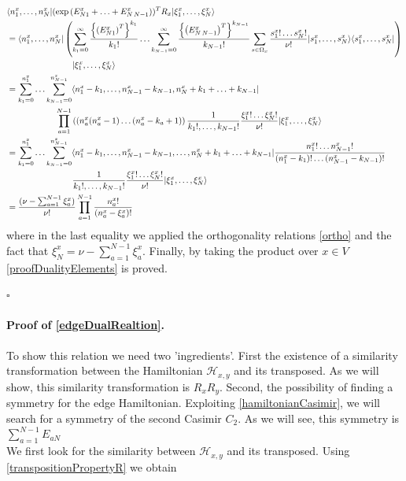 \documentclass[10pt]{article}
\numberwithin{equation}{section}
\numberwithin{equation}{subsection}
\begin{document}
\begin{align*}
&\langle n_{1}^{x},\ldots,n_{N}^{x}|(\exp{(E_{N1}^{x}+\ldots+E_{N\,N-1}^{x})})^{T}R_{x}|\xi_{1}^{x},\ldots,\xi_{N}^{x}\rangle\\&= \langle  n_{1}^{x},\ldots,n_{N}^{x}|\left(\sum_{k_{1}=0}^{\infty}\frac{\left\{\left(E_{N1}^{x}\right)^{T}\right\}^{k_{1}}}{k_{1}!}\ldots\sum_{k_{N-1}=0}^{\infty}\frac{\left\{\left(E_{N\,N-1}^{x}\right)^{T}\right\}^{k_{N-1}}}{k_{N-1}!}\sum_{s\in\Omega_{x}}\frac{s_{1}^{x}!\ldots s_{N}^{x}!}{\nu!}|s_{1}^{x},\ldots,s_{N}^{x}\rangle\langle s_{1}^{x},\ldots,s_{N}^{x}|\right)
\\&
\hspace{2.cm}\qquad|\xi_{1}^{x},\ldots,\xi_{N}^{x}\rangle
\\&=
\sum_{k_{1}=0}^{n_{1}^{x}}\ldots\sum_{k_{N-1}=0}^{n_{N-1}^{x}}\langle n_{1}^{x}-k_{1},\ldots,n_{N-1}^{x}-k_{N-1},n_{N}^{x}+k_{1}+\ldots+k_{N-1}|
\\&
\hspace{2.cm}\prod_{a=1}^{N-1}\left((n_{a}^{x}(n_{a}^{x}-1)\ldots (n_{a}^{x}-k_{a}+1)\right)\frac{1}{k_{1}!,\ldots,k_{N-1}!}\frac{\xi_{1}^{x}!\ldots \xi_{N}^{x}!}{\nu!}|\xi_{1}^{x},\ldots,\xi_{N}^{x}\rangle
\\&=
\sum_{k_{1}=0}^{n_{1}^{x}}\ldots\sum_{k_{N-1}=0}^{n_{N-1}^{x}}\langle n_{1}^{x}-k_{1},\ldots,n_{N-1}^{x}-k_{N-1},\ldots,n_{N}^{x}+k_{1}+\ldots+k_{N-1}|\frac{n_{1}^{x}!\ldots n_{N-1}^{x}!}{(n_{1}^{x}-k_{1})!\ldots(n_{N-1}^{x}-k_{N-1})!}
\\& 
\hspace{2.cm}\qquad\frac{1}{k_{1}!,\ldots,k_{N-1}!}\frac{\xi_{1}^{x}!\ldots \xi_{N}^{x}!}{\nu!}|\xi_{1}^{x},\ldots,\xi_{N}^{x}\rangle
\\&=
\frac{(\nu-\sum_{a=1}^{N-1}\xi_{a}^{x})}{\nu!}\prod_{a=1}^{N-1}\frac{n_{a}^{x}!}{(n_{a}^{x}-\xi_{a}^{x})!}
\end{align*}
where in the last equality we applied the orthogonality relations \eqref{ortho} and the fact that $\xi_{N}^{x}=\nu-\sum_{a=1}^{N-1}\xi_{a}^{x}$. Finally, by taking the product over $x\in V$ \eqref{proofDualityElements} is proved.
\begin{flushright}
    $\square$
\end{flushright}
\paragraph{Proof of \eqref{edgeDualRealtion}.}To show this relation we need two 'ingredients'. First the existence of a similarity transformation between the Hamiltonian $\mathcal{H}_{x,y}$  and its transposed. As we will show, this similarity transformation is $R_{x}R_{y}$.  Second, the possibility of finding a symmetry for the edge Hamiltonian. Exploiting \eqref{hamiltonianCasimir}, we will search for a symmetry of the second Casimir $C_{2}$. As we will see, this symmetry is $\sum_{a=1}^{N-1}E_{aN}$ \\
We first look for the similarity between $\mathcal{H}_{x,y}$ and its transposed. Using \eqref{transpositionPropertyR} we obtain 
 
\end{document}
